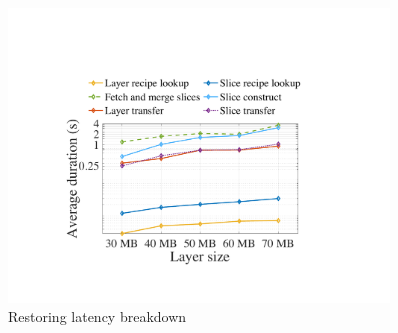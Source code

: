\begin{figure}[t]
\begin{minipage}{0.3\textwidth}
	\includegraphics[width=0.9\textwidth]{graphs/restoringbreakdown.pdf}
	\caption{Restoring latency breakdown}
	\label{fig:eval-restoringbreakdown}
	\end{minipage}
\end{figure}


